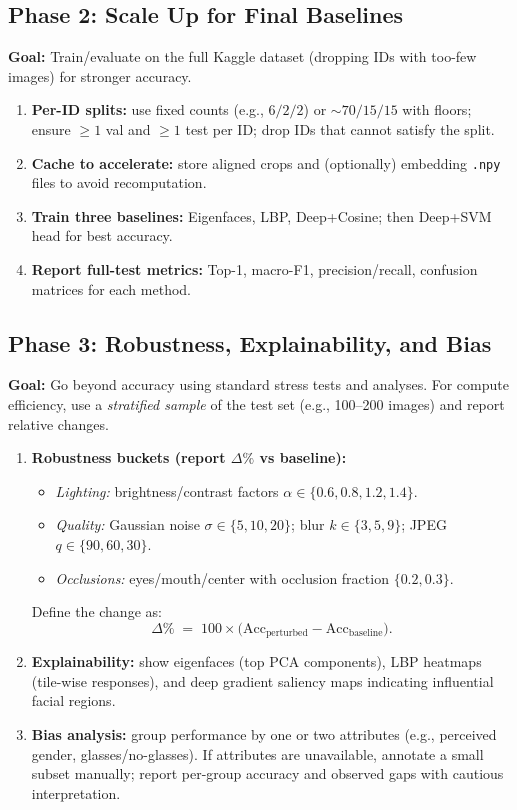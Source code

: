 \documentclass[a4paper]{article}
\begin{document}
\subsection*{Phase 2: Scale Up for Final Baselines}
\textbf{Goal:} Train/evaluate on the full Kaggle dataset (dropping IDs with too-few images) for stronger accuracy.
\begin{enumerate}
  \item \textbf{Per-ID splits:} use fixed counts (e.g., $6/2/2$) or $\sim70/15/15$ with floors; ensure $\geq 1$ val and $\geq 1$ test per ID; drop IDs that cannot satisfy the split.
  \item \textbf{Cache to accelerate:} store aligned crops and (optionally) embedding \texttt{.npy} files to avoid recomputation.
  \item \textbf{Train three baselines:} Eigenfaces, LBP, Deep+Cosine; then Deep+SVM head for best accuracy.
  \item \textbf{Report full-test metrics:} Top-1, macro-F1, precision/recall, confusion matrices for each method.
\end{enumerate}

\subsection*{Phase 3: Robustness, Explainability, and Bias}
\textbf{Goal:} Go beyond accuracy using standard stress tests and analyses. For compute efficiency, use a \emph{stratified sample} of the test set (e.g., 100--200 images) and report relative changes.
\begin{enumerate}
  \item \textbf{Robustness buckets (report $\Delta\%$ vs baseline):}
  \begin{itemize}
    \item \emph{Lighting:} brightness/contrast factors $\alpha \in \{0.6,0.8,1.2,1.4\}$.
    \item \emph{Quality:} Gaussian noise $\sigma \in \{5,10,20\}$; blur $k \in \{3,5,9\}$; JPEG $q \in \{90,60,30\}$.
    \item \emph{Occlusions:} eyes/mouth/center with occlusion fraction $\{0.2,0.3\}$.
  \end{itemize}
  Define the change as:
  \[
    \Delta\% \;=\; 100 \times \big(\mathrm{Acc}_{\text{perturbed}} - \mathrm{Acc}_{\text{baseline}}\big).
  \]
  \item \textbf{Explainability:} show eigenfaces (top PCA components), LBP heatmaps (tile-wise responses), and deep gradient saliency maps indicating influential facial regions.
  \item \textbf{Bias analysis:} group performance by one or two attributes (e.g., perceived gender, glasses/no-glasses). If attributes are unavailable, annotate a small subset manually; report per-group accuracy and observed gaps with cautious interpretation.
\end{enumerate}
\end{document}

